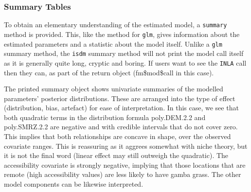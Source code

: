 \documentclass[article,shortnames,nojss]{jss}\usepackage[]{graphicx}\usepackage[]{xcolor}
\begin{document}
\subsubsection*{Summary Tables} \label{subsubsec:summ}

To obtain an elementary understanding of the estimated model, a \texttt{summary} method is provided. This, like the method for \texttt{glm}, gives information about the estimated parameters and a statistic about the model itself. Unlike a \texttt{glm} summary method, the \texttt{isdm} summary method will not print the model call itself as it is generally quite long, cryptic and boring. If users want to see the \texttt{INLA} call then they can, as part of the return object (fm\$mod\$call in this case).

The printed summary object shows univariate summaries of the modelled parameters' posterior distributions. These are arranged into the type of effect (distribution, bias, artefact) for ease of interpretation. In this case, we see that both quadratic terms in the distribution formula poly.DEM.2.2 and poly.SMRZ.2.2 are negative and with credible intervals that do not cover zero. This implies that both relationships are concave in shape, over the observed covariate ranges. This is reassuring as it aggrees somewhat with niche theory, but it is not the final word (linear effect may still outweigh the quadratic). The accessibility covariate is strongly negative, implying that those locations that are remote (high accessibility values) are less likely to have gamba grass. The other model components can be likewise interpreted.
  
\end{document}
